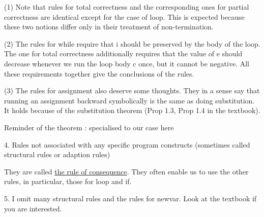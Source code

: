 \documentclass{report}[12pt]
\begin{document}
(1) Note that rules for total correctness and the corresponding ones for partial correctness are identical except for the case of loop. This is expected because these two notions differ only in their treatment of non-termination.

(2) The rules for while require that i should be preserved by the body of the loop. The one for total correctness additionally requires that the value of e should decrease whenever we run the loop body c once, but it cannot be negative. All these requirements together give the conclusions of the rules.

(3) The rules for assignment also deserve some thoughts. They in a sense say that running an assignment backward symbolically is the same as doing substitution. It holds because of the substitution theorem (Prop 1.3, Prop 1.4 in the textbook).

Reminder of the theorem : specialised to our case here
{\centering
{}
}
4. Rules not associated with any specific program constructs (sometimes called structural rules or adaption rules)

\vspace{1cm}

{\centering
\begin{prooftree}
\end{prooftree}
\begin{prooftree}
\end{prooftree}\par
}

\vspace{1cm}

They are called \underline{the rule of consequence}. They often enable us to use the other rules, in particular, those for loop and if.

5. I omit many structural rules and the rules for newvar. Look at the textbook if you are interested.
\end{document}
